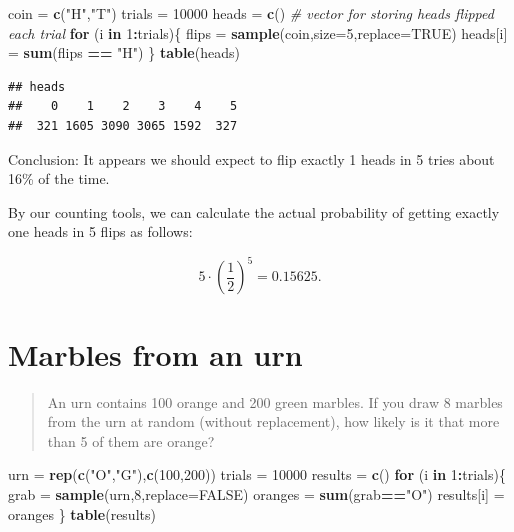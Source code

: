 \documentclass[
]{book}
\newenvironment{Shaded}{\begin{snugshade}}{\end{snugshade}}
\newcommand{\AttributeTok}[1]{\textcolor[rgb]{0.13,0.29,0.53}{#1}}
\newcommand{\CommentTok}[1]{\textcolor[rgb]{0.56,0.35,0.01}{\textit{#1}}}
\newcommand{\ConstantTok}[1]{\textcolor[rgb]{0.56,0.35,0.01}{#1}}
\newcommand{\ControlFlowTok}[1]{\textcolor[rgb]{0.13,0.29,0.53}{\textbf{#1}}}
\newcommand{\DecValTok}[1]{\textcolor[rgb]{0.00,0.00,0.81}{#1}}
\newcommand{\FunctionTok}[1]{\textcolor[rgb]{0.13,0.29,0.53}{\textbf{#1}}}
\newcommand{\NormalTok}[1]{#1}
\newcommand{\OtherTok}[1]{\textcolor[rgb]{0.56,0.35,0.01}{#1}}
\newcommand{\SpecialCharTok}[1]{\textcolor[rgb]{0.81,0.36,0.00}{\textbf{#1}}}
\newcommand{\StringTok}[1]{\textcolor[rgb]{0.31,0.60,0.02}{#1}}
\theoremstyle{definition}
\theoremstyle{definition}
\theoremstyle{definition}
\theoremstyle{definition}
\theoremstyle{remark}
\begin{document}
\begin{Shaded}
\begin{Highlighting}[]
\NormalTok{coin }\OtherTok{=} \FunctionTok{c}\NormalTok{(}\StringTok{"H"}\NormalTok{,}\StringTok{"T"}\NormalTok{)}
\NormalTok{trials }\OtherTok{=} \DecValTok{10000} 
\NormalTok{heads }\OtherTok{=} \FunctionTok{c}\NormalTok{() }\CommentTok{\# vector for storing heads flipped each trial}
\ControlFlowTok{for}\NormalTok{ (i }\ControlFlowTok{in} \DecValTok{1}\SpecialCharTok{:}\NormalTok{trials)\{}
\NormalTok{  flips }\OtherTok{=} \FunctionTok{sample}\NormalTok{(coin,}\AttributeTok{size=}\DecValTok{5}\NormalTok{,}\AttributeTok{replace=}\ConstantTok{TRUE}\NormalTok{)}
\NormalTok{  heads[i] }\OtherTok{=} \FunctionTok{sum}\NormalTok{(flips }\SpecialCharTok{==} \StringTok{"H"}\NormalTok{)}
\NormalTok{\}}
\FunctionTok{table}\NormalTok{(heads)}
\end{Highlighting}
\end{Shaded}

\begin{verbatim}
## heads
##    0    1    2    3    4    5 
##  321 1605 3090 3065 1592  327
\end{verbatim}

Conclusion: It appears we should expect to flip exactly 1 heads in 5 tries about 16\% of the time.

By our counting tools, we can calculate the actual probability of getting exactly one heads in 5 flips as follows:

\[5\cdot \left(\frac{1}{2}\right)^5 = 0.15625.\]

\section{Marbles from an urn}\label{marbles-urn-R}

\begin{quote}
An urn contains 100 orange and 200 green marbles. If you draw 8 marbles from the urn at random (without replacement), how likely is it that more than 5 of them are orange?
\end{quote}

\begin{Shaded}
\begin{Highlighting}[]
\NormalTok{urn }\OtherTok{=} \FunctionTok{rep}\NormalTok{(}\FunctionTok{c}\NormalTok{(}\StringTok{"O"}\NormalTok{,}\StringTok{"G"}\NormalTok{),}\FunctionTok{c}\NormalTok{(}\DecValTok{100}\NormalTok{,}\DecValTok{200}\NormalTok{))}
\NormalTok{trials }\OtherTok{=} \DecValTok{10000}
\NormalTok{results }\OtherTok{=} \FunctionTok{c}\NormalTok{()}
\ControlFlowTok{for}\NormalTok{ (i }\ControlFlowTok{in} \DecValTok{1}\SpecialCharTok{:}\NormalTok{trials)\{}
\NormalTok{  grab }\OtherTok{=} \FunctionTok{sample}\NormalTok{(urn,}\DecValTok{8}\NormalTok{,}\AttributeTok{replace=}\ConstantTok{FALSE}\NormalTok{)}
\NormalTok{  oranges }\OtherTok{=} \FunctionTok{sum}\NormalTok{(grab}\SpecialCharTok{==}\StringTok{"O"}\NormalTok{)}
\NormalTok{  results[i] }\OtherTok{=}\NormalTok{ oranges}
\NormalTok{\}}
\FunctionTok{table}\NormalTok{(results)}
\end{Highlighting}
\end{Shaded}
\end{document}
